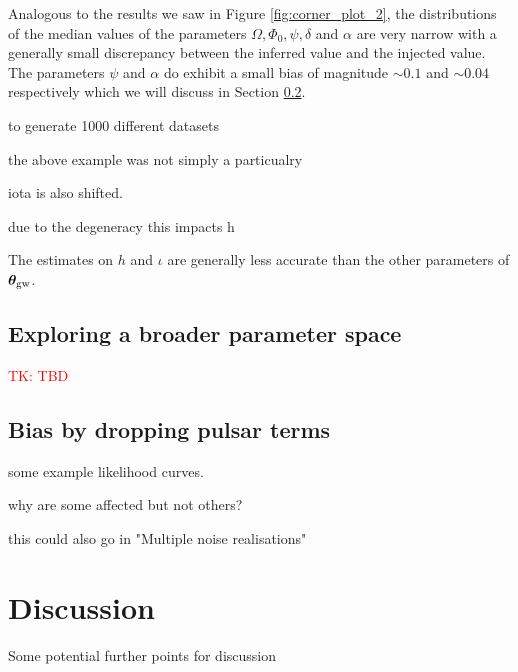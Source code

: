 \documentclass[fleqn,usenatbib,useAMS]{mnras}
\begin{document}
Analogous to the results we saw in Figure \ref{fig:corner_plot_2}, the distributions of the median values of the parameters $\Omega, \Phi_0, \psi, \delta$ and $\alpha$ are very narrow with a generally small discrepancy between the inferred value and the injected value. The parameters $\psi$ and $\alpha$ do exhibit a small bias of magnitude $\sim 0.1$ and $\sim 0.04$ respectively which we will discuss in Section \ref{sec:bias}. 




to generate 1000 different datasets


the above example was not simply a particualry 




iota is also shifted.

due to the degeneracy this impacts h

The estimates on $h$ and $\iota$ are generally less accurate than the other parameters of $\boldsymbol{\theta}_{\rm gw}$. 









\subsection{Exploring a broader parameter space} \label{sec:parameter_space}


\textcolor{red}{TK: TBD}




\subsection{Bias by dropping pulsar terms}\label{sec:bias}

some example likelihood curves. 



why are some affected but not others?


this could also go in "Multiple noise realisations"


\section{Discussion}


Some potential further points for discussion
\end{document}
